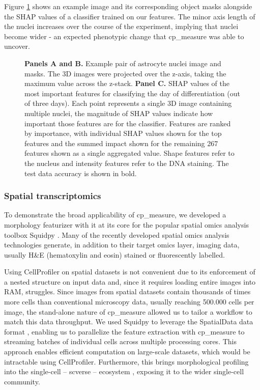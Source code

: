 \documentclass{article}
\begin{document}
Figure \ref{fig:astrocytes} shows an example image and its corresponding object masks alongside the SHAP values of a classifier trained on our features. The minor axis length of the nuclei increases over the course of the experiment, implying that nuclei become wider - an expected phenotypic change that cp\_measure was able to uncover.

\begin{figure}[htbp]
\centering

\caption{\label{fig:astrocytes}\textbf{Panels A and B.} Example pair of astrocyte nuclei image and masks. The 3D images were projected over the z-axis, taking the maximum value across the z-stack. \textbf{Panel C.} SHAP values of the most important features for classifying the day of differentiation (out of three days). Each point represents a single 3D image containing multiple nuclei, the magnitude of SHAP values indicate how important those features are for the classifier. Features are ranked by importance, with individual SHAP values shown for the top features and the summed impact shown for the remaining 267 features shown as a single aggregated value. Shape features refer to the nucleus and intensity features refer to the DNA staining. The test data accuracy is shown in bold.}
\end{figure}

\subsubsection{Spatial transcriptomics}
\label{sec:org5711d86}
To demonstrate the broad applicability of cp\_measure, we developed a morphology featurizer with it at its core for the popular spatial omics analysis toolbox Squidpy \citep{pallaSquidpyScalableFramework2022}.
Many of the recently developed spatial omics analysis technologies generate, in addition to their target omics layer, imaging data, usually H\&E (hematoxylin and eosin) stained or fluorescently labelled. 

Using CellProfiler on spatial datasets is not convenient due to its enforcement of a nested structure on input data and, since it requires loading entire images into RAM, struggles. Since images from spatial datasets contain thousands of times more cells than conventional microscopy data, usually reaching 500.000 cells per image, the stand-alone nature of cp\_measure allowed us to tailor a workflow to match this data throughput. We used Squidpy to leverage the SpatialData data format \citep{Marconato2024-SpatialData}, enabling us to parallelize the feature extraction with cp\_measure to streaming batches of individual cells across multiple processing cores. This approach enables efficient computation on large-scale datasets, which would be intractable using CellProfiler. Furthermore, this brings morphological profiling into the single-cell -- scverse -- ecosystem \citep{Virshup2023-scverse}, exposing it to the wider single-cell community.
\end{document}
